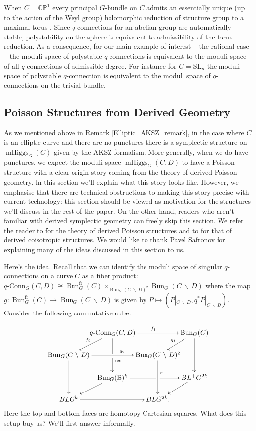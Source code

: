\documentclass[11pt, oneside, reqno]{amsart}
\theoremstyle{definition} \newtheorem{definition}{Definition}[section]
\theoremstyle{definition} \newtheorem{remark}[definition]{Remark}
\theoremstyle{definition} \newtheorem{remarks}[definition]{Remarks}
\theoremstyle{definition} \newtheorem{question}[definition]{Question}
\theoremstyle{definition} \newtheorem*{note}{Note}
\theoremstyle{definition} \newtheorem{example}[definition]{Example}
\theoremstyle{definition} \newtheorem{examples}[definition]{Examples}
\newcommand{\bb}[1]{\mathbb{#1}}
\newcommand{\mr}[1]{\mathrm{#1}}
\newcommand{\bs}{\ \backslash \ }
\newcommand{\SL}{\mathrm{SL}}
\newcommand{\iso}{\cong}
\DeclareMathOperator{\bun}{Bun}
\DeclareMathOperator{\mhiggs}{mHiggs}
\newcommand{\qconn}{q\text{-Conn}}
\newcommand{\fr}{\mathrm{fr}}
\begin{document}
When $C = \bb{CP}^1$ every principal $G$-bundle on $C$ admits an essentially unique (up to the action of the Weyl group) holomorphic reduction of structure group to a maximal torus \cite{GrothendieckSphere}.  Since $q$-connections for an abelian group are automatically stable, polystability on the sphere is equivalent to admissibility of the torus reduction.  As a consequence, for our main example of interest -- the rational case -- the moduli space of polystable $q$-connections is equivalent to the moduli space of all $q$-connections of admissible degree.  For instance for $G=\SL_n$ the moduli space of polystable $q$-connection is equivalent to the moduli space of $q$-connections on the trivial bundle.

\subsection{Poisson Structures from Derived Geometry}
As we mentioned above in Remark \ref{Elliptic_AKSZ_remark}, in the case where $C$ is an elliptic curve and there are no punctures there is a symplectic structure on $\mhiggs_G(C)$ given by the AKSZ formalism.  More generally, when we do have punctures, we expect the moduli space $\mhiggs_G(C,D)$ to have a Poisson structure with a clear origin story coming from the theory of derived Poisson geometry.  In this section we'll explain what this story looks like.  However, we emphasise that there are technical obstructions to making this story precise with current technology: this section should be viewed as motivation for the structures we'll discuss in the rest of the paper.  On the other hand, readers who aren't familiar with derived symplectic geometry can freely skip this section.  We refer the reader to \cite{CPTVV} for the theory of derived Poisson structures and to \cite{MelaniSafronov1, MelaniSafronov2, Spaide} for that of derived coisotropic structures.  We would like to thank Pavel Safronov for explaining many of the ideas discussed in this section to us.

Here's the idea.  Recall that we can identify the moduli space of singular $q$-connections on a curve $C$ as a fiber product: $\qconn_G(C, D) \iso \bun_G^\fr(C) \times_{\bun_G(C \! \bs \! D)^2} \bun_G(C \! \bs \! D)$ where the map $g \colon \bun_G^\fr(C) \to \bun_G(C \! \bs \! D)$ is given by $P \mapsto (P|_{C \! \bs \! D}, q^*P|_{C \! \bs \! D})$.  Consider the following commutative cube:

\[\xymatrix@C-30pt@R-8pt{
& \qconn_G(C, D) \ar[rr]^{f_1} \ar'[d][dd]^(.25){\mr{res}} & & \bun_G(C) \ar[dd]
\\
\bun_G(C \bs D) \ar@{<-}[ur]^{f_2} \ar[rr]^(.6){g_2} \ar[dd] & & \bun_G(C \bs D)^2 \ar@{<-}[ur]^{g_1} \ar[dd]^(.4)r
\\
& \bun_G(\bb B)^k \ar'[r][rr] & & BL^+G^{2k}
\\
BLG^k \ar[rr]\ar@{<-}[ur] & & BLG^{2k}. \ar@{<-}[ur]
}\]
Here the top and bottom faces are homotopy Cartesian squares.  What does this setup buy us?  We'll first answer informally.
\end{document}
